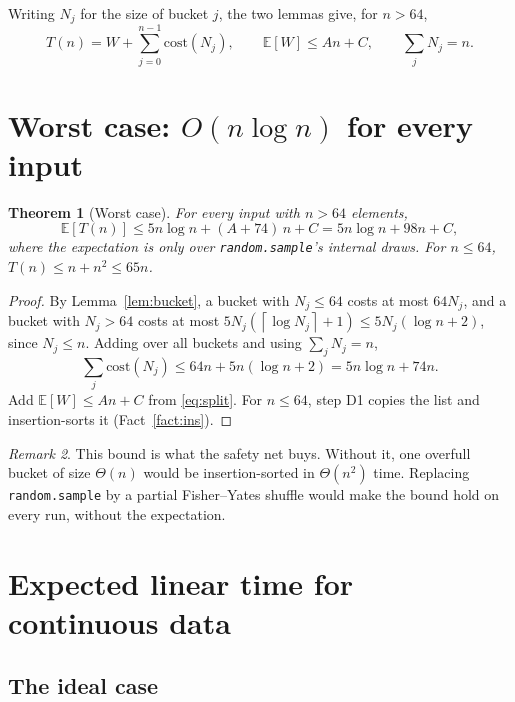 \documentclass[11pt]{article}
\newtheorem{theorem}{Theorem}[section]
\theoremstyle{definition}
\theoremstyle{remark}
\newtheorem{remark}[theorem]{Remark}
\newcommand{\E}{\mathbb{E}}
\newcommand{\ceil}[1]{\left\lceil #1 \right\rceil}
\newcommand{\code}[1]{\texttt{#1}}
\begin{document}
Writing $N_j$ for the size of bucket $j$, the two lemmas give, for $n>64$,
\begin{equation}\label{eq:split}
T(n)=W+\sum_{j=0}^{n-1}\mathrm{cost}(N_j),\qquad \E[W]\le An+C,\qquad
\sum_j N_j=n .
\end{equation}

\section{Worst case: \texorpdfstring{$O(n\log n)$}{O(n log n)} for every input}

\begin{theorem}[Worst case]\label{thm:worst}
For every input with $n>64$ elements,
\[
\E[T(n)]\le 5n\log n+(A+74)\,n+C=5n\log n+98n+C,
\]
where the expectation is only over \code{random.sample}'s internal draws.
For $n\le64$, $T(n)\le n+n^2\le 65n$.
\end{theorem}
\begin{proof}
By Lemma~\ref{lem:bucket}, a bucket with $N_j\le64$ costs at most $64N_j$,
and a bucket with $N_j>64$ costs at most
$5N_j(\ceil{\log N_j}+1)\le5N_j(\log n+2)$, since $N_j\le n$. Adding over
all buckets and using $\sum_j N_j=n$,
\[
\sum_j\mathrm{cost}(N_j)\le 64n+5n(\log n+2)=5n\log n+74n .
\]
Add $\E[W]\le An+C$ from \eqref{eq:split}. For $n\le64$, step D1 copies the
list and insertion-sorts it (Fact~\ref{fact:ins}).
\end{proof}

\begin{remark}
This bound is what the safety net buys. Without it, one overfull bucket of
size $\Theta(n)$ would be insertion-sorted in $\Theta(n^2)$ time. Replacing
\code{random.sample} by a partial Fisher--Yates shuffle would make the
bound hold on every run, without the expectation.
\end{remark}

\section{Expected linear time for continuous data}

\subsection{The ideal case}
\end{document}
